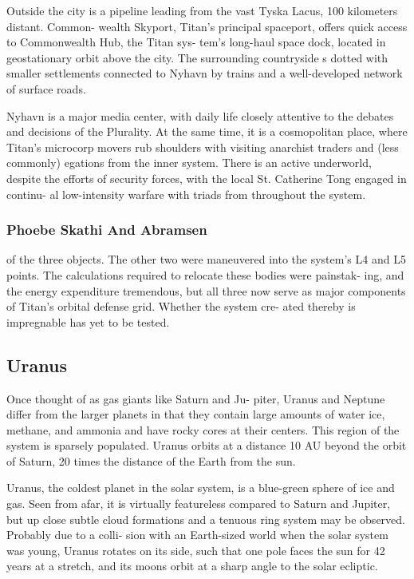 Outside the city is a pipeline  leading  from the 
vast Tyska Lacus, 100 kilometers distant. Common-
wealth Skyport, Titan's principal spaceport, offers 
quick access to Commonwealth Hub, the Titan sys-
tem's long-haul space dock, located in geostationary
orbit above the city. The surrounding countryside 
s  dotted  with smaller settlements connected  to
Nyhavn by trains and a well-developed network of 
surface roads.

Nyhavn is a major media center, with daily life 
closely attentive to the debates and decisions of 
the Plurality. At the same time, it is a cosmopolitan
place, where Titan's microcorp movers rub shoulders
with visiting anarchist traders and (less commonly) 
egations from the inner system. There is an active 
underworld,  despite the efforts of security  forces, 
with the local St. Catherine Tong engaged in continu-
al low-intensity warfare with triads from throughout
the system.

\subsubsection{Phoebe Skathi And Abramsen}

of the three objects. The other two 
were maneuvered into the system's L4 
and L5 points. The calculations required 
to relocate these bodies were painstak-
ing, and the energy expenditure tremendous, 
but all three now serve as major components of 
Titan's orbital defense grid. Whether the system cre-
ated thereby is impregnable has yet to be tested.

\subsection{Uranus}

Once thought of as gas giants like Saturn and Ju-
piter, Uranus and Neptune differ from the larger 
planets in that they contain large amounts of water 
ice, methane, and ammonia and have rocky cores at 
their centers. This region of the system is sparsely 
populated. Uranus orbits at a distance 10 AU beyond 
the orbit of Saturn, 20 times the distance of the Earth 
from the sun.

Uranus, the coldest planet in the solar system, is a 
blue-green sphere of ice and gas. Seen from afar, it is 
virtually featureless compared to Saturn and Jupiter, 
but up close subtle cloud formations and a tenuous 
ring system may be observed. Probably due to a colli-
sion with an Earth-sized world when the solar system 
was young, Uranus rotates on its side, such that one 
pole faces the sun for 42 years at a stretch, and its 
moons orbit at a sharp angle to the solar ecliptic.

